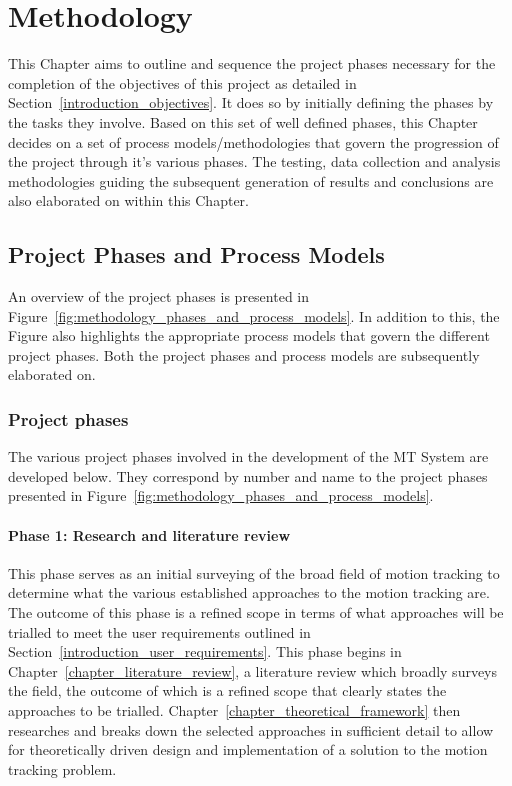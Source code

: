 \chapter{Methodology}\label{chapter_methodology}
This Chapter aims to outline and sequence the project phases necessary for the completion
of the objectives of this project as detailed in
Section~\ref{introduction_objectives}. It does so by initially defining the
phases by the tasks they involve. Based on this set of well defined phases, this
Chapter decides on a set of process models/methodologies that govern the
progression of the project through it's various phases. The testing, data
collection and analysis methodologies guiding the subsequent generation of
results and conclusions are also elaborated on within this Chapter.

\section{Project Phases and Process Models }
An overview of the project phases is presented in Figure~\ref{fig:methodology_phases_and_process_models}.
In addition to this, the Figure also highlights the appropriate process
models that govern the different project phases. Both the project phases and
process models are subsequently elaborated on.

\subsection{Project phases}
The various project phases involved in the development of the MT System are
developed below. They correspond by number and name to the project phases presented in
Figure~\ref{fig:methodology_phases_and_process_models}.

\subsubsection{Phase 1: Research and literature review}
This phase serves as an initial surveying of the broad field of motion tracking to
determine what the various established approaches to the motion tracking are.
The outcome of this phase is a refined scope in terms of what approaches will be
trialled to meet the user requirements outlined in
Section~\ref{introduction_user_requirements}. This phase begins in
Chapter~\ref{chapter_literature_review}, a literature review which broadly
surveys the field, the outcome of which is a refined scope that clearly states
the approaches to be trialled. Chapter~\ref{chapter_theoretical_framework} then
researches and breaks down the selected approaches in sufficient detail to allow for
theoretically driven design and implementation of a solution to the motion
tracking problem.

